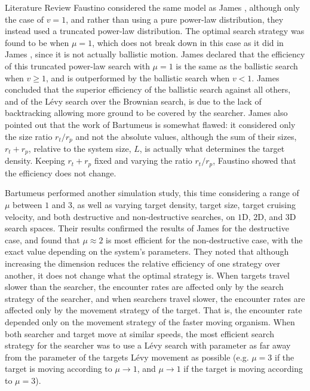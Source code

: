\begin{section}{Literature Review \label{sec:litreview}}
Faustino \etal \cite{Faustino_2007} considered the same model as James \etal \cite{James_2008}, although only the case of $v=1$, and rather than using a pure power-law distribution, they instead used a truncated power-law distribution.
The optimal search strategy was found to be when $\mu=1$, which does not break down in this case as it did in James \etal \cite{James_2008}, since it is not actually ballistic motion.
James \etal \cite{James_2008} declared that the efficiency of this truncated power-law search with $\mu=1$ is the same as the ballistic search when $v \geq 1$, and is outperformed by the ballistic search when $v<1$.
James \etal \cite{James_2008} concluded that the superior efficiency of the ballistic search against all others, and of the L\'{e}vy search over the Brownian search, is due to the lack of backtracking allowing more ground to be covered by the searcher.
James \etal \cite{James_2008} also pointed out that the work of Bartumeus \etal \cite{Bartumeus_2002} is somewhat flawed: it considered only the size ratio $r_t/r_p$ and not the absolute values, although the sum of their sizes, $r_t + r_p$, relative to the system size, $L$, is actually what determines the target density. Keeping $r_t+r_p$ fixed and varying the ratio $r_t/r_p$, Faustino \etal \cite{Faustino_2007} showed that the efficiency does not change.

Bartumeus \etal \cite{Bartumeus_2008_super} performed another simulation study, this time considering a range of $\mu$ between $1$ and $3$, as well as varying target density, target size, target cruising velocity, and both destructive and non-destructive searches, on $1$D, $2$D, and $3$D search spaces.
Their results confirmed the results of James \etal \cite{James_2008} for the destructive case, and found that $\mu \approx 2$ is most efficient for the non-destructive case, with the exact value depending on the system's parameters.
They noted that although increasing the dimension reduces the relative efficiency of one strategy over another, it does not change what the optimal strategy is.
When targets travel slower than the searcher, the encounter rates are affected only by the search strategy of the searcher, and when searchers travel slower, the encounter rates are affected only by the movement strategy of the target.
That is, the encounter rate depended only on the movement strategy of the faster moving organism.
When both searcher and target move at similar speeds, the most efficient search strategy for the searcher was to use a L\'{e}vy search with parameter as far away from the parameter of the targets L\'{e}vy movement as possible (e.g. $\mu=3$ if the target is moving according to $\mu \to 1$, and $\mu \to 1$ if the target is moving according to $\mu=3$).


\end{section}
